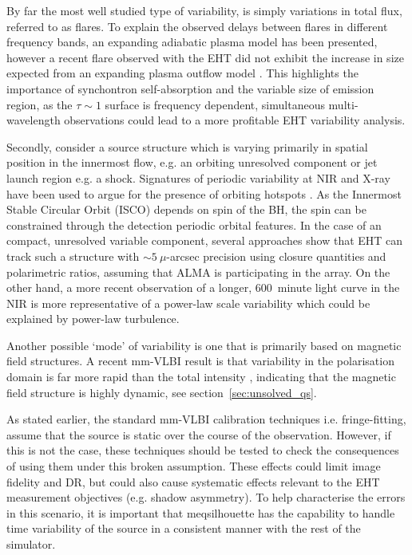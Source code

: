 By far the most well studied type of variability, is simply variations in total flux, referred to as flares. To explain the observed delays between flares in different frequency bands, an expanding adiabatic plasma model \citep[e.g.][]{Marrone_2008} has been presented, however a recent flare observed with the EHT did not exhibit the increase in size expected from an expanding plasma outflow model \cite{Fish_2011}. This highlights the importance of synchontron self-absorption and the variable size of emission region, as the $\tau \sim 1$ surface is frequency dependent, simultaneous multi-wavelength observations could lead to a more profitable EHT variability analysis.

Secondly, consider a source structure which is varying primarily in spatial position in the innermost flow, e.g. an orbiting unresolved component or jet launch region e.g. a shock. Signatures of periodic variability at NIR and X-ray \citep{Genzel_2003,Belanger_2006} have been used to argue for the presence of orbiting hotspots \citep{Doeleman_2009b}. As the Innermost Stable Circular Orbit (ISCO) depends on spin of the BH, the spin can be constrained through the detection periodic orbital features. %
In the case of an compact, unresolved variable component, several approaches \citep{Doeleman_2009b, Fish_2009b, Johnson_2014} show that EHT can track such a structure with $\sim 5\ \mu$-arcsec precision using closure quantities and polarimetric ratios, assuming that ALMA is participating in the array. On the other hand, a more recent observation of a longer, 600~minute light curve in the NIR is more representative of a power-law scale variability \cite{Meyer_2008} which could be explained by power-law turbulence. 

Another possible `mode' of variability is one that is primarily based on magnetic field structures. A recent mm-VLBI result is that variability in the polarisation domain is far more rapid than the total intensity \citep{Johnson_2015b}, indicating that the magnetic field structure is highly dynamic, see section~\ref{sec:unsolved_qs}. 




As stated earlier, the standard mm-VLBI calibration techniques i.e. fringe-fitting, assume that the source is static over the course of the observation. However, if this is not the case, these techniques should be tested to check the consequences of using them under this broken assumption. These effects could limit image fidelity and DR, but could also cause systematic effects relevant to the EHT measurement objectives (e.g. shadow asymmetry). To help characterise the errors in this scenario, it is important that {\sc meqsilhouette} has the capability to handle time variability of the source in a consistent manner with the rest of the simulator.

